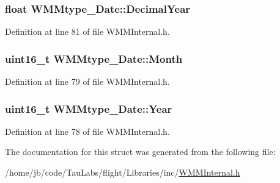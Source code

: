 \hypertarget{struct_w_m_mtype___date_a68078d5d0181333dcf11e24171a218f2}{
\subsubsection[{\-Decimal\-Year}]{\setlength{\rightskip}{0pt plus 5cm}float {\bf \-W\-M\-Mtype\-\_\-\-Date\-::\-Decimal\-Year}}}\label{struct_w_m_mtype___date_a68078d5d0181333dcf11e24171a218f2}


\-Definition at line 81 of file \-W\-M\-M\-Internal.\-h.

\hypertarget{struct_w_m_mtype___date_a7f47a103df8618aac10b109fd5b149c4}{
\subsubsection[{\-Month}]{\setlength{\rightskip}{0pt plus 5cm}uint16\-\_\-t {\bf \-W\-M\-Mtype\-\_\-\-Date\-::\-Month}}}\label{struct_w_m_mtype___date_a7f47a103df8618aac10b109fd5b149c4}


\-Definition at line 79 of file \-W\-M\-M\-Internal.\-h.

\hypertarget{struct_w_m_mtype___date_a82ccdb4608f69fe13225f5add055d3ad}{
\subsubsection[{\-Year}]{\setlength{\rightskip}{0pt plus 5cm}uint16\-\_\-t {\bf \-W\-M\-Mtype\-\_\-\-Date\-::\-Year}}}\label{struct_w_m_mtype___date_a82ccdb4608f69fe13225f5add055d3ad}


\-Definition at line 78 of file \-W\-M\-M\-Internal.\-h.



\-The documentation for this struct was generated from the following file\-:\begin{DoxyCompactItemize}
\item 
/home/jb/code/\-Tau\-Labs/flight/\-Libraries/inc/\hyperlink{_w_m_m_internal_8h}{\-W\-M\-M\-Internal.\-h}\end{DoxyCompactItemize}
